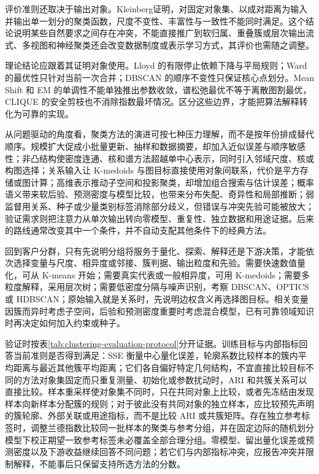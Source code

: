 评价准则还取决于输出对象。Kleinberg证明，对固定对象集、以成对距离为输入并输出单一划分的聚类函数，尺度不变性、丰富性与一致性不能同时满足。这个结论说明某些自然要求之间存在冲突，不能直接推广到软归属、重叠簇或层次输出流式、多视图和神经聚类还会改变数据制度或表示学习方式，其评价也需随之调整。

理论结论应跟着其证明对象使用。Lloyd 的有限停止依赖下降与平局规则；Ward 的最优性只针对当前一次合并；DBSCAN 的顺序不变性只保证核心点划分。Mean Shift 和 EM 的单调性不能单独推出参数收敛，谱松弛最优不等于离散图割最优，CLIQUE 的安全剪枝也不消除指数最坏情况。区分这些边界，才能把算法解释转化为可靠的实现。

从问题驱动的角度看，聚类方法的演进可按七种压力理解，而不是按年份排成替代顺序。规模扩大促成小批量更新、抽样和数据摘要，却加入近似误差与顺序敏感性；非凸结构使密度连通、核和谱方法超越单中心表示，同时引入邻域尺度、核或构图选择；关系输入让 K-medoids 与图目标直接使用对象间联系，代价是平方存储或图计算；高维表示推动子空间和投影聚类，却增加组合搜索与估计误差；概率语义带来软后验、预测密度与模型比较，也带来分布失配、奇异性和局部推断；弱监督用关系、种子或少量类别标签消除部分歧义，但错误与冲突先验可能被放大；验证需求则把注意力从单次输出转向零模型、重复性、独立数据和用途证据。后来的路线通常改变其中一个条件，并不自动支配其他条件下的经典方法。

回到客户分群，只有先说明分组将服务于量化、探索、解释还是下游决策，才能依次选择变量与尺度、相异度或邻接、簇判据、输出粒度和先验。需要快速数值量化，可从 K-means 开始；需要真实代表或一般相异度，可用 K-medoids；需要多粒度解释，采用层次树；需要低密度分隔与噪声识别，考察 DBSCAN、OPTICS 或 HDBSCAN；原始输入就是关系时，先说明边权含义再选择图目标。相关变量因簇而异时考虑子空间，后验和预测密度重要时考虑混合模型，已有可靠领域知识时再决定如何加入约束或种子。

验证时按表\ref{tab:clustering-evaluation-protocol}分开证据。训练目标与内部指标回答当前准则是否得到满足：SSE 衡量中心量化误差，轮廓系数比较样本的簇内平均距离与最近其他簇平均距离；它们各自偏好特定几何结构，不宜直接比较目标不同的方法对象集固定而只重复测量、初始化或参数扰动时，ARI 和共簇关系可以直接比较。样本重采样使对象集不同时，只在共同对象上比较，或者先冻结由发现样本向新样本分配簇的规则；对于彼此没有共同对象的独立样本，应比较预先声明的簇轮廓、外部关联或用途指标，而不是比较 ARI 或共簇矩阵。存在独立参考标签时，调整兰德指数比较同一批样本的聚类与参考分组，并在固定边际的随机划分模型下校正期望一致参考标签未必覆盖全部合理分组。零模型、留出量化误差或预测密度以及下游收益继续回答不同问题；若它们与内部指标冲突，应报告冲突并限制解释，不能事后只保留支持所选方法的分数。

